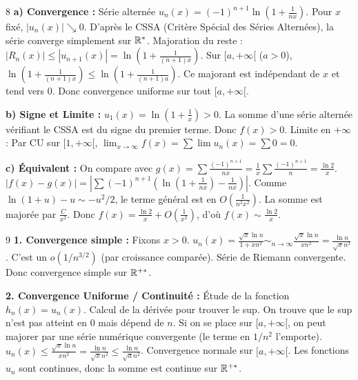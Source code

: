 \documentclass{prepacours}
\begin{document}
\begin{correction}{8}
\textbf{a) Convergence :}
Série alternée $u_n(x) = (-1)^{n+1} \ln(1+\frac{1}{nx})$.
Pour $x$ fixé, $|u_n(x)| \searrow 0$. D'après le CSSA (Critère Spécial des Séries Alternées), la série converge simplement sur $\mathbb{R}^*$.
Majoration du reste : $|R_n(x)| \le |u_{n+1}(x)| = \ln(1+\frac{1}{(n+1)x})$.
Sur $[a, +\infty[$ ($a>0$), $\ln(1+\frac{1}{(n+1)x}) \le \ln(1+\frac{1}{(n+1)a})$.
Ce majorant est indépendant de $x$ et tend vers 0.
Donc convergence uniforme sur tout $[a, +\infty[$.

\textbf{b) Signe et Limite :}
$u_1(x) = \ln(1+\frac{1}{x}) > 0$. La somme d'une série alternée vérifiant le CSSA est du signe du premier terme. Donc $f(x) > 0$.
Limite en $+\infty$ : Par CU sur $[1, +\infty[$, $\lim_{x\to\infty} f(x) = \sum \lim u_n(x) = \sum 0 = 0$.

\textbf{c) Équivalent :}
On compare avec $g(x) = \sum \frac{(-1)^{n+1}}{nx} = \frac{1}{x} \sum \frac{(-1)^{n+1}}{n} = \frac{\ln 2}{x}$.
$|f(x) - g(x)| = \left| \sum (-1)^{n+1} (\ln(1+\frac{1}{nx}) - \frac{1}{nx}) \right|$.
Comme $\ln(1+u) - u \sim -u^2/2$, le terme général est en $O(\frac{1}{n^2 x^2})$.
La somme est majorée par $\frac{C}{x^2}$.
Donc $f(x) = \frac{\ln 2}{x} + O(\frac{1}{x^2})$, d'où $f(x) \sim \frac{\ln 2}{x}$.
\end{correction}

\begin{correction}{9}
\textbf{1. Convergence simple :}
Fixons $x > 0$. $u_n(x) = \frac{\sqrt{x} \ln n}{1+x n^2} \sim_{n\to\infty} \frac{\sqrt{x} \ln n}{x n^2} = \frac{\ln n}{\sqrt{x} n^2}$.
C'est un $o(1/n^{3/2})$ (par croissance comparée). Série de Riemann convergente.
Donc convergence simple sur $\mathbb{R}^{+*}$.

\textbf{2. Convergence Uniforme / Continuité :}
Étude de la fonction $h_n(x) = u_n(x)$.
Calcul de la dérivée pour trouver le sup.
On trouve que le sup n'est pas atteint en 0 mais dépend de $n$.
Si on se place sur $[a, +\infty[$, on peut majorer par une série numérique convergente (le terme en $1/n^2$ l'emporte).
$u_n(x) \le \frac{\sqrt{x} \ln n}{x n^2} = \frac{\ln n}{\sqrt{x} n^2} \le \frac{\ln n}{\sqrt{a} n^2}$.
Convergence normale sur $[a, +\infty[$.
Les fonctions $u_n$ sont continues, donc la somme est continue sur $\mathbb{R}^{+*}$.
\end{correction}
\end{document}
